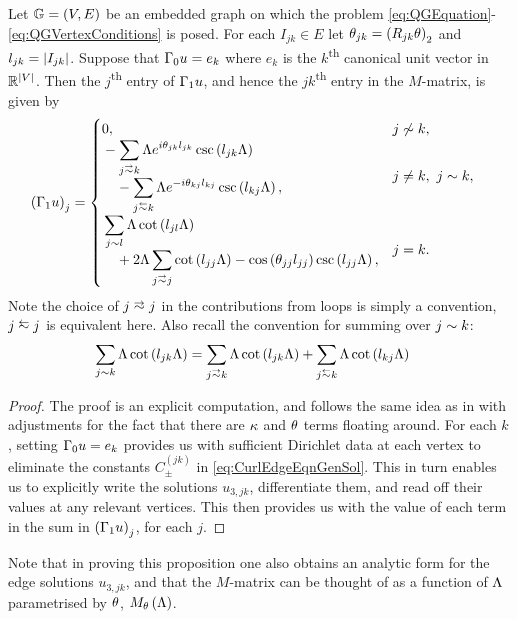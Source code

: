 \begin{prop} \label{prop:M-MatrixEntries}
	Let $\mathbb{G}=\left( V,E \right)$ be an embedded graph on which the problem \eqref{eq:QGEquation}-\eqref{eq:QGVertexConditions} is posed.
	For each $I_{jk}\in E$ let $\theta_{jk} = \left( R_{jk}\theta \right)_2$ and $l_{jk} = \left\lvert I_{jk} \right\rvert$.
	Suppose that $\Gamma_0 u = e_k$ where $e_k$ is the $k$\textsuperscript{th} canonical unit vector in $\mathbb{R}^{\left\lvert V \right\rvert}$.
	Then the $j$\textsuperscript{th} entry of $\Gamma_1 u$, and hence the $jk$\textsuperscript{th} entry in the $M$-matrix, is given by
	\begin{align*}
		\bracs{\nmap u}_j &= 
		\begin{cases}
			\!\begin{aligned}
				&0,
			\end{aligned}			
			& j \not\con k, \\
			\!\begin{aligned}
				&-\sum_{j\conLeft k} \effFreq e^{i\qm_{jk}l_{jk}} \csc\bracs{l_{jk}\effFreq} 
				\\ &\quad - \sum_{j\conRight k} \effFreq e^{-i\qm_{kj}l_{kj}} \csc\bracs{l_{kj}\effFreq},
			\end{aligned}
			& j\neq k, \ j\con k, \\
			\!\begin{aligned}
				&\sum_{j\con l} \effFreq\cot\bracs{l_{jl}\effFreq}
				\\ &\quad + 2\effFreq\sum_{j\conLeft j} \cot\bracs{l_{jj}\effFreq} - \cos\bracs{\qm_{jj}l_{jj}}\csc\bracs{l_{jj}\effFreq},
			\end{aligned}
			& j=k.
		\end{cases}
	\end{align*}
	Note the choice of $j\conLeft j$ in the contributions from loops is simply a convention, $j\conRight j$ is equivalent here.
	Also recall the convention for summing over $j\sim k$:
	\begin{align*}
		\sum_{j\con k} \effFreq\cot\bracs{l_{jk}\effFreq} &= \sum_{j\conLeft k} \effFreq\cot\bracs{l_{jk}\effFreq}	+ \sum_{j\conRight k} \effFreq\cot\bracs{l_{kj}\effFreq}
	\end{align*}
\end{prop}
\begin{proof}
	The proof is an explicit computation, and follows the same idea as in \cite{ershova2014isospectrality} with adjustments for the fact that there are $\kappa$ and $\theta$ terms floating around.
	For each $k$, setting $\Gamma_0 u = e_k$ provides us with sufficient Dirichlet data at each vertex to eliminate the constants $C^{(jk)}_{\pm}$ in \eqref{eq:CurlEdgeEqnGenSol}.
	This in turn enables us to explicitly write the solutions $u_{3,jk}$, differentiate them, and read off their values at any relevant vertices.
	This then provides us with the value of each term in the sum in $\left( \Gamma_1 u \right)_j$, for each $j$.
\end{proof}
Note that in proving this proposition one also obtains an analytic form for the edge solutions $u_{3,jk}$, and that the $M$-matrix can be thought of as a function of $\Lambda$ parametrised by $\theta$, $M_{\theta}\left( \Lambda \right)$.

